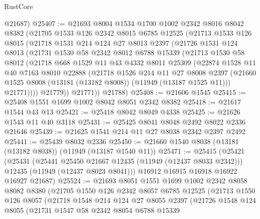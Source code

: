 \begin{lexlean}{RustCore}
\begin{coremodule}
      @21687)
@25407 := @21693
    @8004
    @1534
    @1700
    @1002
    @2342
    @8016
    @8042
    @8382
    (@21705
      @1533
      @126
      @2342
      @8015
      @6785
      @12525
      (@21713
        @1533
        @126
        @8015
        (@21718
          @1531
          @214
          @124
          @27
          @8013
          @2397
          (@21726
            @1531
            @124
            @8013
            (@21731
              @1530
              @58
              @2342
              @8012
              @6788
              @15339
              (@21713
                @1530
                @58
                @8012
                (@21718
                  @668
                  @1529
                  @11
                  @43
                  @4332
                  @8011
                  @25309
                  (@22874
                    @1528
                    @11
                    @40
                    @7163
                    @8010
                    @22888
                    (@21718
                      @1526
                      @214
                      @11
                      @27
                      @8008
                      @2397
                      (@21660 @1525 @8008 (@13181 (@13182 @8008)) (@11949 (@13187 @1525 @11)))
                      @21771))))
              @21779))
          @21771))
      @21788)
@25408 := @21606 @1545
@25415 := @25408 @1551 @1699 @1002 @8042 @8051 @2342 @8382
@25418 := @21617 @1544 @43 @13
@25421 := @25418 @8042 @8049 @4338
@25425 := @21626 @1543 @11 @40 @3118
@25431 := @25425 @8041 @8048 @2492 @8022 @2336 @21646
@25439 := @21625 @1541 @214 @11 @27 @8038 @2342 @2397 @2492
@25441 := @25439 @8032 @2336
@25450 := @21660 @1540 @8038 (@13181 (@13182 @8038)) (@11949 (@13187 @1540 @11))
@25471 := @25415
    (@25421
      (@25431
        (@25441 @25450 @21667 @12435 (@11949 (@12437 @8033 @2342)))
        @12435
        (@11949 (@12437 @8023 @8041)))
      @16912
      @16915
      @16918
      @16922
      @16927
      @21687)
@25524 := @21693
    @8051
    @1551
    @1699
    @1002
    @2342
    @8058
    @8082
    @8380
    (@21705
      @1550
      @126
      @2342
      @8057
      @6785
      @12525
      (@21713
        @1550
        @126
        @8057
        (@21718
          @1548
          @214
          @124
          @27
          @8055
          @2397
          (@21726
            @1548
            @124
            @8055
            (@21731
              @1547
              @58
              @2342
              @8054
              @6788
              @15339

\end{coremodule}
\end{lexlean}
